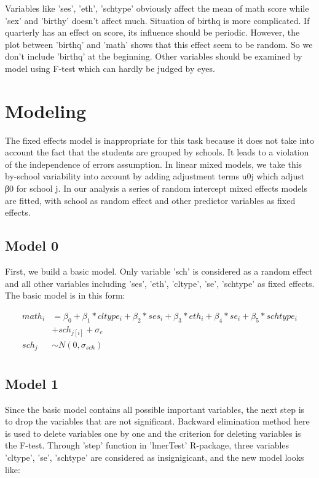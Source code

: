 \documentclass{article}
\begin{document}
Variables like 'ses', 'eth', 'schtype' obviously affect the mean of math score while 'sex' and 'birthy' doesn’t affect much. 
Situation of birthq is more complicated. If quarterly has an effect on score, its influence should be periodic. 
However, the plot between 'birthq' and 'math' shows that this effect seem to be random. So we don't include 'birthq' at the beginning.
Other variables should be examined by model using F-test which can hardly be judged by eyes.

\section{Modeling}

The fixed effects model is inappropriate for this task because it does not take into account the fact that the students are grouped 
by schools. It leads to a violation of the independence of errors assumption. In linear mixed models, we take this by-school 
variability into account by adding adjustment terms u0j which adjust β0 for school j. In our analysis a series of random intercept 
mixed effects models are fitted, with school as random effect and other predictor variables as fixed effects. 

\subsection{Model 0}



First, we build a basic model. Only variable 'sch' is considered as a random effect and all other variables including 'ses', 'eth', 
'cltype', 'se', 'schtype' as fixed effects. The basic model is in this form:

\begin{align*}
    math_i 
    &= \beta_0 + \beta_1*cltype_i + \beta_2*ses_i + \beta_3*eth_i + \beta_4*se_i + \beta_5*schtype_i \\
    &+ sch_{j[i]} + \sigma_e\\
    sch_j &\sim N(0, \sigma_{sch})\\
\end{align*}

\subsection{Model 1}

Since the basic model contains all possible important variables, the next step is to drop the variables that are not significant. 
Backward elimination method here is used to delete variables one by one and the criterion for deleting variables is the F-test. 
Through 'step' function in 'lmerTest' R-package, three variables 'cltype', 'se', 'schtype' are considered as insignigicant, 
and the new model looks like:
\end{document}
